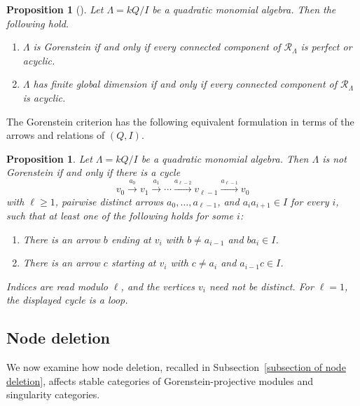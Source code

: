 \documentclass[11pt]{article}
\providecommand{\varLambda}{\Lambda}
\newtheorem{proposition}[theorem]{Proposition}
\theoremstyle{definition}
\begin{document}
		\begin{proposition}[{\cite[Proposition~5.5]{CSZ18}}]
			\label{proposition of relation quiver Gorenstein criterion}
			Let $\varLambda=kQ/I$ be a quadratic monomial algebra. Then the following hold.
			\begin{enumerate}
				\item
				$\varLambda$ is Gorenstein if and only if every connected component of $\mathcal R_{\varLambda}$ is perfect or acyclic.

				\item
				$\varLambda$ has finite global dimension if and only if every connected component of $\mathcal R_{\varLambda}$ is acyclic.
			\end{enumerate}
		\end{proposition}

		The Gorenstein criterion has the following equivalent formulation in terms of the arrows and relations of $(Q,I)$.

		\begin{proposition}\label{proposition of forbidden cycle criterion}
			Let $\varLambda=kQ/I$ be a quadratic monomial algebra. Then $\varLambda$ is not Gorenstein if and only if there is a cycle
			\[
				v_0\xrightarrow{a_0}v_1\xrightarrow{a_1}\cdots
				\xrightarrow{a_{\ell-2}}v_{\ell-1}
				\xrightarrow{a_{\ell-1}}v_0
			\]
			with $\ell\geq1$, pairwise distinct arrows
			$a_0,\ldots,a_{\ell-1}$, and $a_i a_{i+1}\in I$ for every $i$,
			such that at least one of the following holds for some $i$:
			\begin{enumerate}
				\item
				There is an arrow $b$ ending at $v_i$ with
				$b\ne a_{i-1}$ and $ba_i\in I$.

				\item
				There is an arrow $c$ starting at $v_i$ with
				$c\ne a_i$ and $a_{i-1}c\in I$.
			\end{enumerate}
			Indices are read modulo $\ell$, and the vertices $v_i$
			need not be distinct.
			For $\ell=1$, the displayed cycle is a loop.
		\end{proposition}


	\subsection{Node deletion}\label{subsection of triangulated node deletion}

		We now examine how node deletion, recalled in Subsection~\ref{subsection of node deletion}, affects stable categories of Gorenstein-projective modules and singularity categories.
\end{document}
